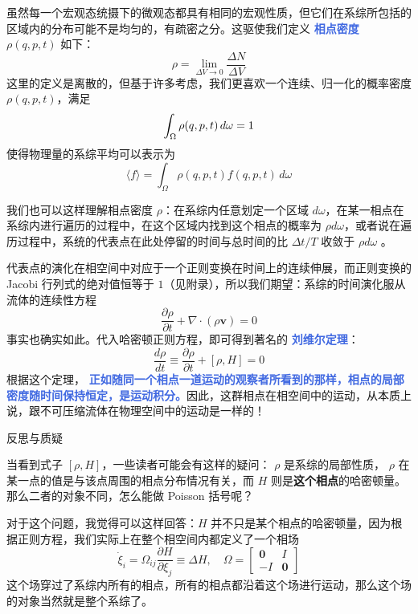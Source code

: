 \documentclass[hyperref,UTF-8]{ctexbook}
\newcommand{\0}{\boldsymbol{0}}
\begin{document}
虽然每一个宏观态统摄下的微观态都具有相同的宏观性质，但它们在系综所包括的区域内的分布可能不是均匀的，有疏密之分。这驱使我们定义 \textcolor{RoyalBlue}{\textbf{\kaishu 相点密度}} $\rho(q,p,t)$ 如下：
\begin{equation}
    \rho = \lim_{\Delta V\rightarrow 0} \frac{\Delta N}{\Delta V} 
\end{equation}
这里的定义是离散的，但基于许多考虑，我们更喜欢一个连续、归一化的概率密度 $\rho(q,p,t)$，满足
\begin{equation}
    \int_\Omega \rho(q,p,t)\,d\omega = 1 \\
\end{equation}
使得物理量的系综平均可以表示为
\begin{equation}
    \langle f \rangle =  \int_\Omega \rho(q,p,t)f(q,p,t)\,d\omega
\end{equation}

我们也可以这样理解相点密度 $\rho$：在系综内任意划定一个区域 $d \omega$，在某一相点在系综内进行遍历的过程中，在这个区域内找到这个相点的概率为 $\rho d \omega$，或者说在遍历过程中，系统的代表点在此处停留的时间与总时间的比 $\Delta t / T$  收敛于 $\rho d \omega$ 。

代表点的演化在相空间中对应于一个正则变换在时间上的连续伸展\cite{liang}，而正则变换的Jacobi 行列式的绝对值恒等于 $1$（见附录），所以我们期望：系综的时间演化服从流体的连续性方程
\begin{equation}
    \frac{\partial \rho}{\partial t} + \nabla \cdot (\rho \bm{v}) = 0
\end{equation}
事实也确实如此。代入哈密顿正则方程，即可得到著名的 \textcolor{RoyalBlue}{\textbf{\kaishu 刘维尔定理}}：
\begin{equation}
    \frac{d \rho}{dt} \equiv \frac{\partial \rho}{\partial t} + [\rho ,H] = 0
\end{equation}
根据这个定理， \textcolor{RoyalBlue}{\textbf{\kaishu 正如随同一个相点一道运动的观察者所看到的那样，相点的局部密度随时间保持恒定，是运动积分。}}因此，这群相点在相空间中的运动，从本质上说，跟不可压缩流体在物理空间中的运动是一样的！

\begin{justification}{\kaishu 反思与质疑}
    \kaishu \fontsize{11pt}{16pt}
    
    \quad\quad 当看到式子 $[\rho , H]$，一些读者可能会有这样的疑问： $\rho$ 是系综的局部性质， $\rho$ 在某一点的值是与该点周围的相点分布情况有关，而 $H$ 则是\textbf{这个相点}的哈密顿量。那么二者的对象不同，怎么能做 Poisson 括号呢？
    
    \quad\quad 对于这个问题，我觉得可以这样回答：$H$ 并不只是某个相点的哈密顿量，因为根据正则方程，我们实际上在整个相空间内都定义了一个相场\cite{pan}
    \[
        \dot\xi_i = \Omega_{ij}\frac{\partial H}{\partial \xi_j} \equiv \Delta H,\quad \Omega =
        \begin{bmatrix}
            \bm{0} & I\\
            -I& \bm{0}
        \end{bmatrix}
    \]
    这个场穿过了系综内所有的相点，所有的相点都沿着这个场进行运动，那么这个场的对象当然就是整个系综了。
    \end{justification}
\end{document}

